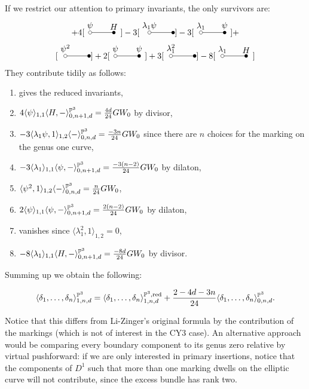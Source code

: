 If we restrict our attention to primary invariants, the only survivors are:
\begin{multline*}
 [\reduced]+ 4[\Dunouno]-3[\Dunotre]-3[\Dunoquat]+\\
 [\Dunocin]+2[\Dunosei]+3[\Dunoott]-8[\Dunonov]
\end{multline*}
They contribute tidily as follows:
\begin{enumerate}
 \item gives the reduced invariants,
 \item $4\langle\psi\rangle_{1,1}\langle H,-\rangle^{\mathbb P^3}_{0,n+1,d}=\frac{4d}{24} GW_0$ by divisor,
 \item $-3\langle\lambda_1\psi,1\rangle_{1,2}\langle -\rangle^{\mathbb P^3}_{0,n,d}=\frac{-3n}{24} GW_0$ since there are $n$ choices for the marking on the genus one curve,
 \item $-3\langle\lambda_1\rangle_{1,1}\langle \psi,-\rangle^{\mathbb P^3}_{0,n+1,d}=\frac{-3(n-2)}{24} GW_0$ by dilaton,
 \item $\langle\psi^2,1\rangle_{1,2}\langle -\rangle^{\mathbb P^3}_{0,n,d}=\frac{n}{24} GW_0$,
 \item $2\langle\psi\rangle_{1,1}\langle \psi,-\rangle^{\mathbb P^3}_{0,n+1,d}=\frac{2(n-2)}{24} GW_0$ by dilaton,
 \item vanishes since $\langle\lambda_1^2,1\rangle_{1,2}=0$,
 \item $-8\langle\lambda_1\rangle_{1,1}\langle H,-\rangle^{\mathbb P^3}_{0,n+1,d}=\frac{-8d}{24} GW_0$ by divisor.
\end{enumerate}
Summing up we obtain the following:
\begin{prop} \[\langle \delta_1,\ldots,\delta_n \rangle^{\mathbb P^3}_{1,n,d}=\langle \delta_1,\ldots,\delta_n \rangle^{\mathbb P^3,\mathrm{red}}_{1,n,d}+\frac{2-4d-3n}{24}\langle \delta_1,\ldots,\delta_n \rangle^{\mathbb P^3}_{0,n,d}.\] \end{prop}
Notice that this differs from Li-Zinger's original formula by the contribution of the markings (which is not of interest in the CY3 case). An alternative approach would be comparing every boundary component to its genus zero relative by virtual pushforward: if we are only interested in primary insertions, notice that the components of $D^1$ such that more than one marking dwells on the elliptic curve will not contribute, since the excess bundle has rank two.

